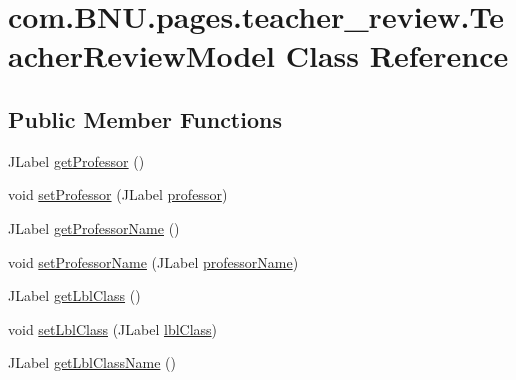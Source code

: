 \hypertarget{classcom_1_1_b_n_u_1_1pages_1_1teacher__review_1_1_teacher_review_model}{}\section{com.\+B\+N\+U.\+pages.\+teacher\+\_\+review.\+Teacher\+Review\+Model Class Reference}
\label{classcom_1_1_b_n_u_1_1pages_1_1teacher__review_1_1_teacher_review_model}
\subsection*{Public Member Functions}
\begin{DoxyCompactItemize}
\item 
J\+Label \mbox{\hyperlink{classcom_1_1_b_n_u_1_1pages_1_1teacher__review_1_1_teacher_review_model_a2a98d58fbdf712acf979a14a3e9a9148}{get\+Professor}} ()
\item 
void \mbox{\hyperlink{classcom_1_1_b_n_u_1_1pages_1_1teacher__review_1_1_teacher_review_model_a96c3b0a104effa7b1ecdb9a6464c1d1f}{set\+Professor}} (J\+Label \mbox{\hyperlink{classcom_1_1_b_n_u_1_1pages_1_1teacher__review_1_1_teacher_review_model_a8d647118e1777a82931832fa2f3315a0}{professor}})
\item 
J\+Label \mbox{\hyperlink{classcom_1_1_b_n_u_1_1pages_1_1teacher__review_1_1_teacher_review_model_a59e96a1e1036bf4e232877a58af4d71c}{get\+Professor\+Name}} ()
\item 
void \mbox{\hyperlink{classcom_1_1_b_n_u_1_1pages_1_1teacher__review_1_1_teacher_review_model_a28b53f5dc862b327e53154dedc45d7e2}{set\+Professor\+Name}} (J\+Label \mbox{\hyperlink{classcom_1_1_b_n_u_1_1pages_1_1teacher__review_1_1_teacher_review_model_a4e2b76e1938fc13e601c7eac6a049941}{professor\+Name}})
\item 
J\+Label \mbox{\hyperlink{classcom_1_1_b_n_u_1_1pages_1_1teacher__review_1_1_teacher_review_model_a50ebe9babd573b3b64833d5ad4c6a956}{get\+Lbl\+Class}} ()
\item 
void \mbox{\hyperlink{classcom_1_1_b_n_u_1_1pages_1_1teacher__review_1_1_teacher_review_model_a2af9b8af7c9ec11cffc1bf9ca58a7a3f}{set\+Lbl\+Class}} (J\+Label \mbox{\hyperlink{classcom_1_1_b_n_u_1_1pages_1_1teacher__review_1_1_teacher_review_model_a0691f63f5d201358ce395e7100987542}{lbl\+Class}})
\item 
J\+Label \mbox{\hyperlink{classcom_1_1_b_n_u_1_1pages_1_1teacher__review_1_1_teacher_review_model_a56f46f6e70f5f99faba182b18a5896d2}{get\+Lbl\+Class\+Name}} ()

\end{DoxyCompactItemize}

